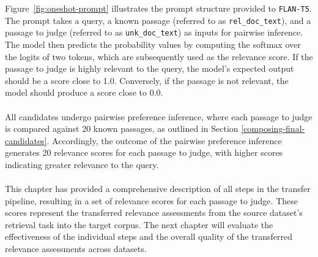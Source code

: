 Figure~\ref{fig:oneshot-prompt} illustrates the prompt structure provided to \texttt{FLAN-T5}. The prompt takes a query, a known passage (referred to as \texttt{rel\_doc\_text}), and a passage to judge (referred to as \texttt{unk\_doc\_text}) as inputs for pairwise inference. The model then predicts the probability values by computing the softmax over the logits of two tokens, which are subsequently used as the relevance score. If the passage to judge is highly relevant to the query, the model's expected output should be a score close to 1.0. Conversely, if the passage is not relevant, the model should produce a score close to 0.0.
\\\\
All candidates undergo pairwise preference inference, where each passage to judge is compared against 20 known passages, as outlined in Section \ref{composing-final-candidates}. Accordingly, the outcome of the pairwise preference inference generates 20 relevance scores for each passage to judge, with higher scores indicating greater relevance to the query.
\\\\
This chapter has provided a comprehensive description of all steps in the transfer pipeline, resulting in a set of relevance scores for each passage to judge. These scores represent the transferred relevance assessments from the source dataset's retrieval task into the target corpus. The next chapter will evaluate the effectiveness of the individual steps and the overall quality of the transferred relevance assessments across datasets.
